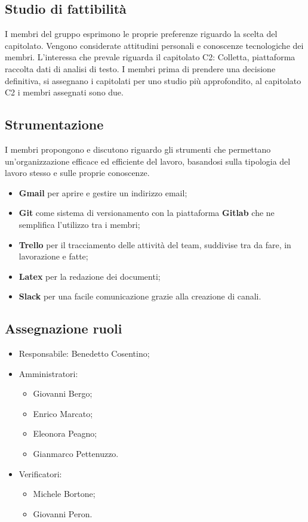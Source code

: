 \documentclass[11pt,a4paper]{article}
\begin{document}
	\subsection{Studio di fattibilità}
	I membri del gruppo esprimono le proprie preferenze riguardo la scelta del capitolato. Vengono considerate attitudini personali e conoscenze tecnologiche dei membri. L'interessa che prevale riguarda il capitolato C2: Colletta, piattaforma raccolta dati di analisi di testo. I membri prima di prendere una decisione definitiva, si assegnano i capitolati per uno studio più approfondito, al capitolato C2 i membri assegnati sono due.
	\subsection{Strumentazione}	
	I membri propongono e discutono riguardo gli strumenti che permettano un'organizzazione efficace ed efficiente del lavoro,  basandosi sulla tipologia del lavoro stesso e sulle proprie conoscenze. 
	\begin{itemize}
	\item  \textbf{Gmail} per aprire e gestire un indirizzo email;
	\item  \textbf{Git} come sistema di versionamento con la piattaforma \textbf{Gitlab} che ne semplifica l'utilizzo tra i membri;
	\item  \textbf{Trello} per il tracciamento delle attività del team, suddivise tra da fare, in lavorazione e fatte;
	\item  \textbf{Latex} per la redazione dei documenti;
	\item \textbf{Slack} per una facile comunicazione grazie alla creazione di canali.
	\end{itemize}
	\subsection{Assegnazione ruoli} 
	
	\begin{itemize}
	\item Responsabile: Benedetto Cosentino;
	\item Amministratori:
		\begin{itemize}
		\item Giovanni Bergo;
		\item Enrico Marcato;
		\item Eleonora Peagno;
		\item Gianmarco Pettenuzzo.
		\end{itemize}
	\item Verificatori:
		\begin{itemize}
			\item Michele Bortone;
			\item Giovanni Peron.
		\end{itemize}
	\end{itemize}
\end{document}
